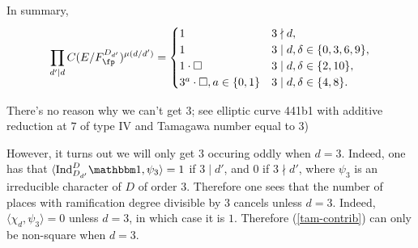 \vspace{1em}
In summary, 
\begin{equation}
    \prod_{d ' \mid d} C(E / F_{\fp}^{D_{d'}})^{\mu(d / d')}
    = 
    \begin{cases}
        1 & 3 \nmid d, \\
        1 & 3 \mid d, \delta \in \{0, 3, 6, 9\}, \\
        1 \cdot \square & 3 \mid d, \delta \in \{2, 10\}, \\
        3^a \cdot\square, a \in \{0,1\} & 3 \mid d, \delta \in \{4,8\}.
    \end{cases}
\end{equation}

\begin{rem}
   There's no reason why we can't get 3; see elliptic curve 441b1 with additive reduction at $7$ of type IV and Tamagawa number equal to $3$) 
\end{rem}


However, it turns out we will only get $3$ occuring oddly when $d = 3$. Indeed, one has that $\langle \Ind_{D_{d'}}^D \trivial, \psi_3 \rangle = 1$ if $3 \mid d'$, and $0$ if $3 \nmid d'$, where $\psi_3$ is an irreducible character of $D$ of order $3$. Therefore one sees that the number of places with ramification degree divisible by $3$ cancels unless $d = 3$. Indeed, $\langle \chi_d , \psi_3 \rangle = 0$ unless $d = 3$, 
in which case it is $1$. Therefore (\ref{tam-contrib}) can only be non-square when $d = 3$.
